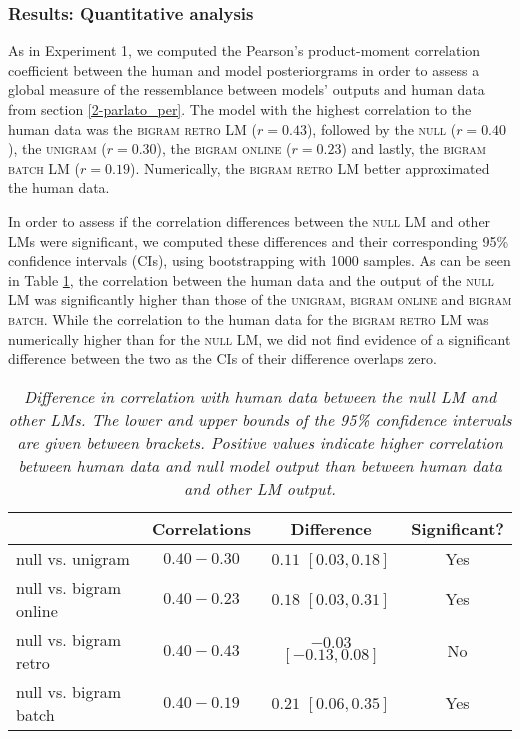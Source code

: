 {\subsubsection{Results: Quantitative analysis}
As in Experiment 1, we computed the Pearson's product-moment correlation coefficient between the human and model posteriorgrams in order to assess a global measure of the ressemblance between models' outputs and human data from section \ref{2-parlato_per}. The model with the highest correlation to the human data was the \textsc{bigram retro} LM ($r = 0.43$), followed by the \textsc{null} ($r = 0.40$), the \textsc{unigram} ($r = 0.30$), the \textsc{bigram online} ($r = 0.23$) and lastly, the \textsc{bigram batch} LM ($r = 0.19$). Numerically, the \textsc{bigram retro} LM better approximated the human data.

In order to assess if the correlation differences between the \textsc{null} LM and other LMs were significant, we computed these differences and their corresponding 95\% confidence intervals (CIs), using bootstrapping with 1000 samples. As can be seen in Table \ref{tab:parlato_lms-cor_diff}, the correlation between the human data and the output of the \textsc{null} LM was significantly higher than those of the \textsc{unigram}, \textsc{bigram online} and \textsc{bigram batch}. While the correlation to the human data for the \textsc{bigram retro} LM was numerically higher than for the \textsc{null} LM, we did not find evidence of a significant difference between the two as the CIs of their difference overlaps zero.

\begin{table}[ht]
\centering
\caption{\textit{Difference in correlation with human data between the null LM and other LMs. The lower and upper bounds of the 95\% confidence intervals are given between brackets. Positive values indicate higher correlation between human data and null model output than between human data and other LM output.}}
\label{tab:parlato_lms-cor_diff}
\vspace{0.25cm}
\begin{tabular}{lccc}
   \toprule
  & Correlations & Difference & Significant? \\  \midrule
null vs. unigram & $0.40 - 0.30$ & $0.11$ $[0.03, 0.18]$ &  Yes \\ 
null vs. bigram online  & $0.40 - 0.23$ & $0.18$ $[0.03, 0.31]$ &  Yes \\ 
null vs. bigram retro & $0.40 - 0.43$ & $-0.03$ $[-0.13, 0.08]$ &  No \\ 
null vs. bigram batch & $0.40 - 0.19$ & $0.21$ $[0.06, 0.35]$ & Yes \\  \bottomrule 
\end{tabular}
\end{table}

}
